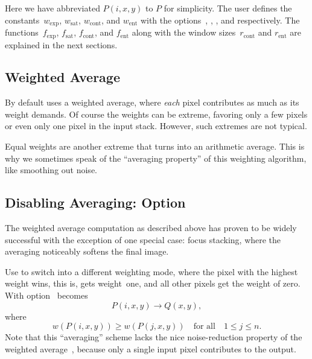 \noindent Here we have abbreviated $P(i, x, y)$ to $P$ for simplicity.  The user defines the
constants~$w_{\mathrm{exp}}$, $w_{\mathrm{sat}}$, $w_{\mathrm{cont}}$, and $w_{\mathrm{ent}}$
with the options~, ,
, and  respectively.  The
functions~$f_{\mathrm{exp}}$, $f_{\mathrm{sat}}$, $f_{\mathrm{cont}}$, and $f_{\mathrm{ent}}$
along with the window sizes~$r_{\mathrm{cont}}$ and $r_{\mathrm{ent}}$ are explained in the next
sections.


\subsection[Weighted Average]{\label{sec:weighted-average}%
  Weighted Average}

By default \App{} uses a weighted average, where \emph{each} pixel contributes as much as its
weight demands.  Of course the weights can be extreme, favoring only a few pixels or even only
one pixel in the input stack.  However, such extremes are not typical.

Equal weights are another extreme that turns  into an arithmetic average.
This is why we sometimes speak of the ``averaging property'' of this weighting algorithm, like
smoothing out noise.


\subsection[Disabling Averaging]{\label{sec:disabling-averaging}%
  Disabling Averaging: Option~}

The weighted average computation as described above has proven to be widely successful with the
exception of one special case: focus stacking, where the averaging noticeably softens the final
image.

Use  to switch \App{} into a different weighting mode, where the pixel with
the highest weight wins, this is, gets weight~one, and all other pixels get the weight of zero.
With option~  becomes
\[                              %
    P(i, x, y) \rightarrow Q(x, y),
\]
where
\[
    w(P(i, x, y)) \geq w(P(j, x, y)) \quad \mbox{for all}\quad 1 \leq j \leq n.
\]
\noindent Note that this ``averaging'' scheme lacks the nice noise-reduction property of the
weighted average~, because only a single input pixel contributes to the
output.


